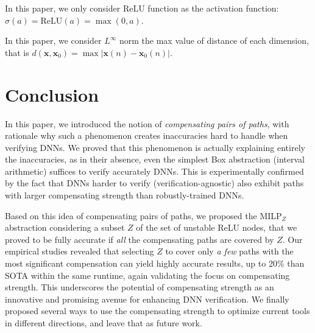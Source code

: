 \documentclass[a4paper,UKenglish,cleveref, autoref, thm-restate]{lipics-v2021}
\newcommand{\vx}{\boldsymbol{x}}
\newcommand{\MILP}{{\textrm{MILP}}}
\newcommand{\ReLU}{\mathrm{ReLU}}
\begin{document}
	In this paper, we only consider $\ReLU$ function as the activation function: $\sigma(a)=\ReLU(a)=\max(0,a)$. 
	
	In this paper, we consider $L^{\infty}$ norm the max value of distance of each dimension, that is $d(\vx,\boldsymbol{x}_0)=\max |\boldsymbol{x}(n)-\boldsymbol{x}_0(n)|$. 
	\fi
	
	









\section{Conclusion}

In this paper, we introduced the notion of {\em compensating pairs of paths}, with rationale why such a phenomenon creates inaccuracies hard to handle when verifying DNNs. We proved that this phenomenon is actually explaining entirely the inaccuracies, as in their absence, even the simplest Box abstraction (interval arithmetic) suffices to verify accurately DNNs. This is experimentally confirmed by the fact that DNNs harder to verify (verification-agnostic) also exhibit paths with larger compensating strength than  robustly-trained DNNs.

Based on this idea of compensating pairs of paths, we proposed the $\MILP_{Z}$ abstraction considering a subset $Z$ of the set of unstable ReLU nodes, that we proved to be fully accurate if {\em all} the compensating paths are covered by $Z$. Our empirical studies revealed that selecting $Z$ to cover only {\em a few} paths with the most significant compensation can yield highly accurate results, up to 20\% than SOTA within the same runtime, again validating the focus on compensating strength. This underscores the potential of compensating strength as an innovative and promising avenue for enhancing DNN verification.
 We finally proposed several ways to use the compensating strength to optimize current tools in different directions, and leave that as future work.
\newpage




\newpage

\appendix


\end{document}
